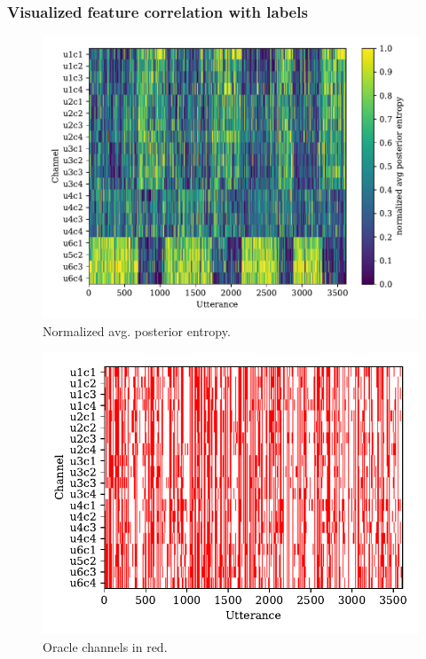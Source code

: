 \documentclass{beamer}
\begin{document}
\begin{frame}
  \frametitle{Visualized feature correlation with labels}
  \begin{minipage}[tb]{0.495\textwidth}
    \begin{figure}
      \includegraphics[width=\textwidth]{img/avg_post_entropy-S09}
      \caption{Normalized avg. posterior entropy.}
    \end{figure}
  \end{minipage}%
  \hfill
  \begin{minipage}[tb]{0.495\textwidth}
  \begin{figure}
      \includegraphics[width=\textwidth]{img/oracle_channels-S09.pdf}
      \caption{Oracle channels in red.}
  \end{figure}
  \end{minipage}
\end{frame}
  
\end{document}
